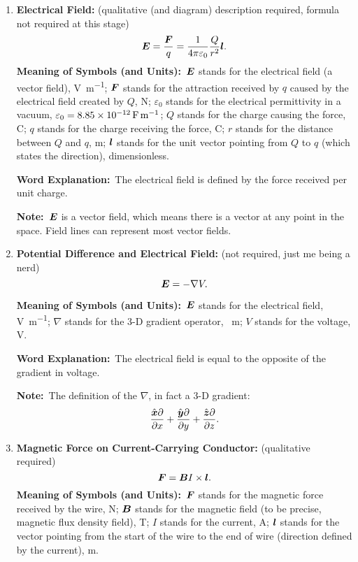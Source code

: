 \documentclass[8pt]{article}
\newcommand{\MeanSymb}{\textbf{Meaning of Symbols (and Units):}\ }
\newcommand{\WordExpl}{\textbf{Word Explanation:}\ }
\newcommand{\Note}{\textbf{Note:}\ }
\begin{document}
\begin{enumerate}
                \item \textbf{Electrical Field:} (qualitative (and diagram) description required, formula not required at this stage)
                \[
                    \boldsymbol{E} = \frac{\boldsymbol{F}}{q} = \frac{1}{4 \pi \varepsilon_0} \frac{Q}{r^2} \boldsymbol{l}.
                \]
                \MeanSymb \(\boldsymbol{E}\) stands for the electrical field (a vector field), \unit{\volt\per\metre}; \(\boldsymbol{F}\) stands for the attraction received by \(q\) caused by the electrical field created by \(Q\), \unit{\newton}; \(\varepsilon_0\) stands for the electrical permittivity in a vacuum, \(\varepsilon_0 = \qty{8.85 e -12}{\farad \per \metre}\); \(Q\) stands for the charge causing the force, \unit{\coulomb}; \(q\) stands for the charge receiving the force, \unit{\coulomb}; \(r\) stands for the distance between \(Q\) and \(q\), \unit{\metre}; \(\boldsymbol{l}\) stands for the unit vector pointing from \(Q\) to \(q\) (which states the direction), dimensionless.

                \WordExpl The electrical field is defined by the force received per unit charge.

                \Note \(\boldsymbol{E}\) is a vector field, which means there is a vector at any point in the space. Field lines can represent most vector fields.

                \item \textbf{Potential Difference and Electrical Field:} (not required, just me being a nerd)
                \[
                    \boldsymbol{E} = - \nabla V.
                \]

                \MeanSymb \(\boldsymbol{E}\) stands for the electrical field, \unit{\volt \per \metre}; \(\nabla\) stands for the 3-D gradient operator, \unit{\per \metre}; \(V\) stands for the voltage, \unit{\volt}.

                \WordExpl The electrical field is equal to the opposite of the gradient in voltage.

                \Note The definition of the \(\nabla\), in fact a 3-D gradient:
                \[
                    \frac{\hat{\boldsymbol{x}} \partial}{\partial x} + \frac{\hat{\boldsymbol{y}} \partial}{\partial y} + \frac{\hat{\boldsymbol{z}} \partial}{\partial z}.
                \]
                \item \textbf{Magnetic Force on Current-Carrying Conductor:} (qualitative required)
                \[
                    \boldsymbol{F} = \boldsymbol{B} I \times \boldsymbol{l}.
                \]
                \MeanSymb \(\boldsymbol{F}\) stands for the magnetic force received by the wire, \unit{\newton}; \(\boldsymbol{B}\) stands for the magnetic field (to be precise, magnetic flux density field), \unit{\tesla}; \(I\) stands for the current, \unit{\ampere}; \(\boldsymbol{l}\) stands for the vector pointing from the start of the wire to the end of wire (direction defined by the current), \unit{\metre}.


\end{enumerate}
\end{document}
